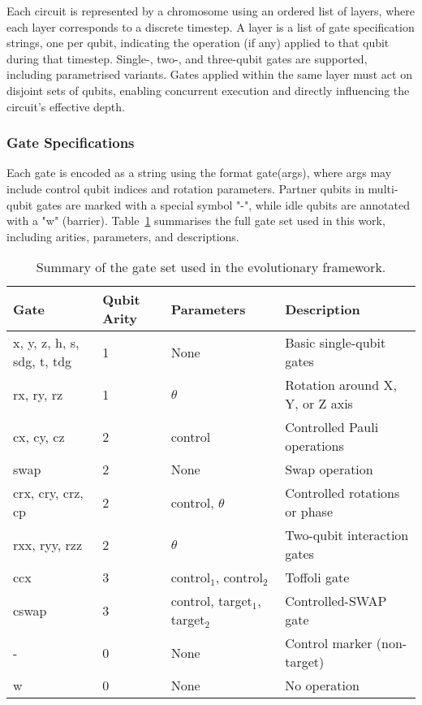 \documentclass[11pt,a4paper]{article}
\begin{document}
Each circuit is represented by a chromosome using an ordered list of layers, where each layer corresponds to a discrete timestep. A layer is a list of gate specification strings, one per qubit, indicating the operation (if any) applied to that qubit during that timestep. Single-, two-, and three-qubit gates are supported, including parametrised variants. Gates applied within the same layer must act on disjoint sets of qubits, enabling concurrent execution and directly influencing the circuit’s effective depth.

\subsubsection*{Gate Specifications} Each gate is encoded as a string using the format gate(args), where args may include control qubit indices and rotation parameters. Partner qubits in multi-qubit gates are marked with a special symbol "-", while idle qubits are annotated with a "w" (barrier). Table~\ref{tab:gateset} summarises the full gate set used in this work, including arities, parameters, and descriptions.

\begin{table}[H]
    \centering
    \begin{tabular}{llll}
        \toprule
        \textbf{Gate} & \textbf{Qubit Arity} & \textbf{Parameters} & \textbf{Description} \\
        \midrule
        x, y, z, h, s, sdg, t, tdg & 1 & None & Basic single-qubit gates \\
        rx, ry, rz & 1 & $\theta$ & Rotation around X, Y, or Z axis \\
        cx, cy, cz & 2 & control & Controlled Pauli operations \\
        swap & 2 & None & Swap operation \\
        crx, cry, crz, cp & 2 & control, $\theta$ & Controlled rotations or phase \\
        rxx, ryy, rzz & 2 & $\theta$ & Two-qubit interaction gates \\
        ccx & 3 & control$_1$, control$_2$ & Toffoli gate \\
        cswap & 3 & control, target$_1$, target$_2$ & Controlled-SWAP gate \\
        - & 0 & None & Control marker (non-target) \\
        w & 0 & None & No operation \\
        \bottomrule
    \end{tabular}
    \caption{Summary of the gate set used in the evolutionary framework.}
    \label{tab:gateset}
\end{table}
\end{document}
